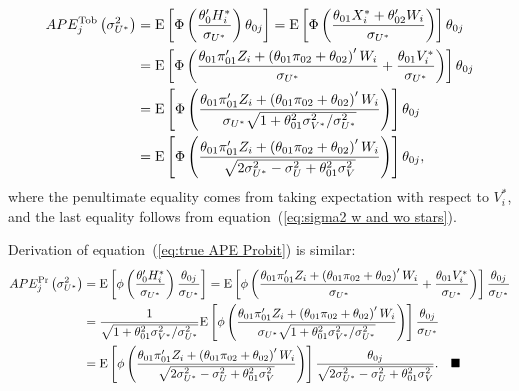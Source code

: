 \documentclass[12pt]{article}
\begin{document}
\begin{appendices}
\begin{align*}
APE_{j}^{\text{Tob}}\left( \sigma _{U^{\ast }}^{2}\right) & =\mathrm{E}\left[
\Phi \left( \frac{\theta _{0}^{\prime }H_{i}^{\ast }}{\sigma _{U^{\ast }}}%
\right) \theta _{0j}\right] =\mathrm{E}\left[ \Phi \left( \frac{\theta
_{01}X_{i}^{\ast }+\theta _{02}^{\prime }W_{i}}{\sigma _{U^{\ast }}}\right) %
\right] \theta _{0j}{} \\
& =\mathrm{E}\left[ \Phi \left( \frac{\theta _{01}\pi _{01}^{\prime
}Z_{i}+\left( \theta _{01}\pi _{02}+\theta _{02}\right) ^{\prime }W_{i}}{%
\sigma _{U^{\ast }}}+\frac{\theta _{01}V_{i}^{\ast }}{\sigma _{U^{\ast }}}%
\right) \right] \theta _{0j} \\
& =\mathrm{E}\left[ \Phi \left( \frac{\theta _{01}\pi _{01}^{\prime
}Z_{i}+\left( \theta _{01}\pi _{02}+\theta _{02}\right) ^{\prime }W_{i}}{%
\sigma _{U^{\ast }}\sqrt{1+\theta _{01}^{2}\sigma _{V^{\ast }}^{2}/\sigma
_{U^{\ast }}^{2}}}\right) \right] \theta _{0j} \\
& ={}\mathrm{E}\left[ \Phi \left( 
\frac{\theta _{01}\pi _{01}^{\prime }Z_{i}+\left( \theta _{01}\pi
_{02}+\theta _{02}\right) ^{\prime }W_{i}}{\sqrt{2\sigma _{U^{\ast
}}^{2}-\sigma _{U}^{2}+\theta _{01}^{2}\sigma _{V}^{2}}}\right) \right]
\theta _{0j},
\end{align*}%
where the penultimate equality comes from taking expectation with respect to 
$V_{i}^{\ast }$, and the last equality follows from equation~(\ref{eq:sigma2
w and wo stars}).

\bigskip

Derivation of equation~(\ref{eq:true APE Probit}) is similar:%
\begin{align*}
APE_{j}^{\text{Pr}}\left( \sigma _{U^{\ast }}^{2}\right) & =\mathrm{E}\left[
\phi \left( \frac{\theta _{0}^{\prime }H_{i}^{\ast }}{\sigma _{U^{\ast }}}%
\right) \frac{\theta _{0j}}{\sigma _{U^{\ast }}}\right] =\mathrm{E}\left[
\phi \left( \frac{\theta _{01}\pi _{01}^{\prime }Z_{i}+\left( \theta
_{01}\pi _{02}+\theta _{02}\right) ^{\prime }W_{i}}{\sigma _{U^{\ast }}}+%
\frac{\theta _{01}V_{i}^{\ast }}{\sigma _{U^{\ast }}}\right) \right] \frac{%
\theta _{0j}}{\sigma _{U^{\ast }}} \\
& =\frac{1}{\sqrt{1+\theta _{01}^{2}\sigma _{V^{\ast }}^{2}/\sigma _{U^{\ast
}}^{2}}}\mathrm{E}\left[ \phi \left( \frac{\theta _{01}\pi _{01}^{\prime
}Z_{i}+\left( \theta _{01}\pi _{02}+\theta _{02}\right) ^{\prime }W_{i}}{%
\sigma _{U^{\ast }}\sqrt{1+\theta _{01}^{2}\sigma _{V^{\ast }}^{2}/\sigma
_{U^{\ast }}^{2}}}\right) \right] \frac{\theta _{0j}}{\sigma _{U^{\ast }}} \\
& ={}\mathrm{E}\left[ \phi
\left( \frac{\theta _{01}\pi _{01}^{\prime }Z_{i}+\left( \theta _{01}\pi
_{02}+\theta _{02}\right) ^{\prime }W_{i}}{\sqrt{2\sigma _{U^{\ast
}}^{2}-\sigma _{U}^{2}+\theta _{01}^{2}\sigma _{V}^{2}}}\right) \right] 
\frac{\theta _{0j}}{\sqrt{2\sigma _{U^{\ast }}^{2}-\sigma _{U}^{2}+\theta
_{01}^{2}\sigma _{V}^{2}}}.\quad \blacksquare
\end{align*}


\end{appendices}
\end{document}
